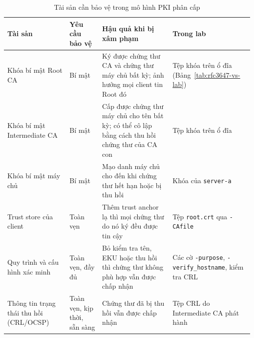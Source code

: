 \begin{table}[!htbp]
\centering
\small
\renewcommand{\arraystretch}{1.15}
\begin{tabularx}{\textwidth}{>{\raggedright\arraybackslash}p{2.9cm}>{\raggedright\arraybackslash}p{2.0cm}>{\raggedright\arraybackslash}X>{\raggedright\arraybackslash}p{3.4cm}}
\toprule
\textbf{Tài sản} & \textbf{Yêu cầu bảo vệ} & \textbf{Hậu quả khi bị xâm phạm} & \textbf{Trong lab} \\
\midrule
Khóa bí mật Root CA & Bí mật & Ký được chứng thư CA và chứng thư máy chủ bất kỳ; ảnh hưởng mọi client tin Root đó & Tệp khóa trên ổ đĩa (Bảng~\ref{tab:rfc3647-vs-lab}) \\
\midrule
Khóa bí mật Intermediate CA & Bí mật & Cấp được chứng thư máy chủ cho tên bất kỳ; có thể cô lập bằng cách thu hồi chứng thư của CA con & Tệp khóa trên ổ đĩa \\
\midrule
Khóa bí mật máy chủ & Bí mật & Mạo danh máy chủ cho đến khi chứng thư hết hạn hoặc bị thu hồi & Khóa của \texttt{server-a} \\
\midrule
Trust store của client & Toàn vẹn & Thêm trust anchor lạ thì mọi chứng thư do nó ký đều được tin cậy & Tệp \texttt{root.crt} qua \texttt{-CAfile} \\
\midrule
Quy trình và cấu hình xác minh & Toàn vẹn, đầy đủ & Bỏ kiểm tra tên, EKU hoặc thu hồi thì chứng thư không phù hợp vẫn được chấp nhận & Các cờ \texttt{-purpose}, \texttt{-verify\_hostname}, kiểm tra CRL \\
\midrule
Thông tin trạng thái thu hồi (CRL/OCSP) & Toàn vẹn, kịp thời, sẵn sàng & Chứng thư đã bị thu hồi vẫn được chấp nhận & Tệp CRL do Intermediate CA phát hành \\
\bottomrule
\end{tabularx}
\caption{Tài sản cần bảo vệ trong mô hình PKI phân cấp}
\label{tab:pki-assets}
\end{table}
